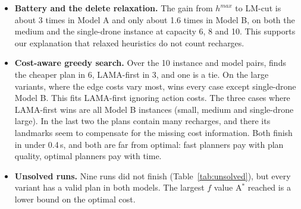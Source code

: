 \documentclass[11pt,a4paper]{article}
\newcommand{\p}[1]{\texttt{\detokenize{#1}}}
\begin{document}
\begin{itemize}
    matches what dominance would predict: LM-cut $\geq h^{max} \geq$ blind in
    every state, and for consistent heuristics A$^*$ with the larger one
    expands at most the same states (up to ties). $h^{max}$ is consistent but
    LM-cut is not in general, so for LM-cut this is an observation, not a
    guarantee.
  \item \textbf{Battery and the delete relaxation.} The gain from $h^{max}$ to
    LM-cut is about 3 times in Model A and only about 1.6 times in Model B, on
    both the medium and the single-drone instance at capacity 6,
    8 and 10. This supports our explanation that relaxed
    heuristics do not count recharges.
  \item \textbf{Cost-aware greedy search.} Over the 10 instance and model
    pairs, \p{gbfs-ff} finds the cheaper plan in 6, LAMA-first in 3, and one
    is a tie. On the large variants, where the edge costs vary most,
    \p{gbfs-ff} wins every case except single-drone Model B. This fits
    LAMA-first ignoring action costs. The three cases where LAMA-first wins
    are all Model B instances (small, medium and single-drone large). In the
    last two the plans contain many recharges, and there its landmarks seem
    to compensate for the missing cost information. Both finish in under 0.4\,s, and
    both are far from optimal: fast planners pay with plan quality, optimal
    planners pay with time.
  \item \textbf{Unsolved runs.} Nine runs did not finish
    (Table~\ref{tab:unsolved}), but every variant has a valid plan in both
    models. The largest $f$ value A$^*$ reached is a lower bound on the
    optimal cost.
\end{itemize}
\end{document}

